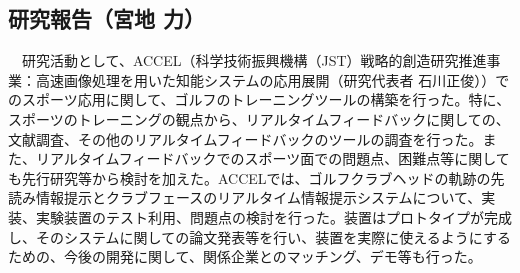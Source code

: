 \subsection{研究報告（宮地 力）}
　研究活動として、ACCEL（科学技術振興機構（JST）戦略的創造研究推進事業：高速画像処理を用いた知能システムの応用展開（研究代表者 石川正俊））でのスポーツ応用に関して、ゴルフのトレーニングツールの構築を行った。特に、スポーツのトレーニングの観点から、リアルタイムフィードバックに関しての、文献調査、その他のリアルタイムフィードバックのツールの調査を行った。また、リアルタイムフィードバックでのスポーツ面での問題点、困難点等に関しても先行研究等から検討を加えた。ACCELでは、ゴルフクラブヘッドの軌跡の先読み情報提示とクラブフェースのリアルタイム情報提示システムについて、実装、実験装置のテスト利用、問題点の検討を行った。装置はプロトタイプが完成し、そのシステムに関しての論文発表等を行い、装置を実際に使えるようにするための、今後の開発に関して、関係企業とのマッチング、デモ等も行った。